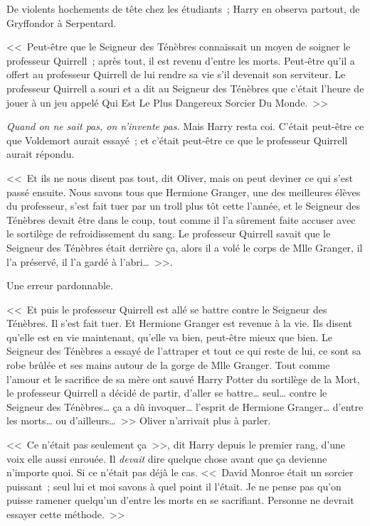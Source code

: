 De violents hochements de tête chez les étudiants~; Harry en observa partout, de Gryffondor à Serpentard.

<<~Peut-être que le Seigneur des Ténèbres connaissait un moyen de soigner le professeur Quirrell~; après tout, il est revenu d'entre les morts. Peut-être qu'il a offert au professeur Quirrell de lui rendre sa vie s'il devenait son serviteur. Le professeur Quirrell a souri et a dit au Seigneur des Ténèbres que c'était l'heure de jouer à un jeu appelé Qui Est Le Plus Dangereux Sorcier Du Monde.~>>

\emph{Quand on ne sait pas, on n'invente pas.} Mais Harry resta coi. C'était peut-être ce que Voldemort aurait essayé~; et c'était peut-être ce que le professeur Quirrell aurait répondu.

<<~Et ils ne nous disent pas tout, dit Oliver, mais on peut deviner ce qui s'est passé ensuite. Nous savons tous que Hermione Granger, une des meilleures élèves du professeur, s'est fait tuer par un troll plus tôt cette l'année, et le Seigneur des Ténèbres devait être dans le coup, tout comme il l'a sûrement faite accuser avec le sortilège de refroidissement du sang. Le professeur Quirrell savait que le Seigneur des Ténèbres était derrière ça, alors il a volé le corps de Mlle Granger, il l'a préservé, il l'a gardé à l'abri…~>>.

Une erreur pardonnable.

<<~Et puis le professeur Quirrell est allé se battre contre le Seigneur des Ténèbres. Il s'est fait tuer. Et Hermione Granger est revenue à la vie. Ils disent qu'elle est en vie maintenant, qu'elle va bien, peut-être mieux que bien. Le Seigneur des Ténèbres a essayé de l'attraper et tout ce qui reste de lui, ce sont sa robe brûlée et ses mains autour de la gorge de Mlle Granger. Tout comme l'amour et le sacrifice de sa mère ont sauvé Harry Potter du sortilège de la Mort, le professeur Quirrell a décidé de partir, d'aller se battre… seul… contre le Seigneur des Ténèbres… ça a dû invoquer… l'esprit de Hermione Granger… d'entre les morts… ou d'ailleurs…~>> Oliver n'arrivait plus à parler.

<<~Ce n'était pas seulement ça~>>, dit Harry depuis le premier rang, d'une voix elle aussi enrouée. Il \emph{devait} dire quelque chose avant que ça devienne n'importe quoi. Si ce n'était pas déjà le cas. <<~David Monroe était un sorcier puissant~; seul lui et moi savons à quel point il l'était. Je ne pense pas qu'on puisse ramener quelqu'un d'entre les morts en se sacrifiant. Personne ne devrait essayer cette méthode.~>>

